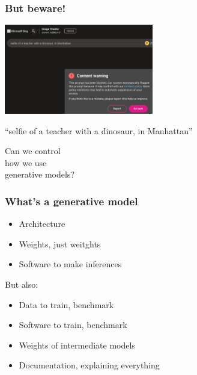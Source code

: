 \documentclass[17pt,aspectratio=169,hyperref={pdfusetitle,colorlinks,allcolors=olive}]{beamer}
\begin{document}
\begin{frame}[fragile]
  \frametitle{But beware!}

  \includegraphics[width=6.5cm]{figs/bing-content-warning}

  {\small
  ``selfie of a teacher with a dinosaur, in Manhattan''
}  
\end{frame}

\begin{frame}[fragile]

  {\Large
    Can we control \\
    how we use \\
    generative models? \\
  }  
\end{frame}

\begin{frame}[fragile]
  \frametitle{What's a generative model}

  \begin{itemize}
  \item Architecture
  \item Weights, just weitghts
  \item Software to make inferences
  \end{itemize}

  But also:

  \begin{itemize}
  \item Data to train, benchmark
  \item Software to train, benchmark
  \item Weights of intermediate models
  \item Documentation, explaining everything
  \end{itemize}
\end{frame}
\end{document}
